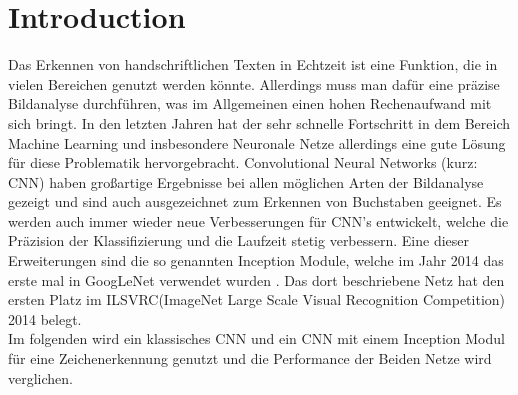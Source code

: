 \documentclass[runningheads,a4paper]{llncs}[2015/06/24]
\begin{document}
\section{Introduction}\label{sec:intro}
Das Erkennen von handschriftlichen Texten in Echtzeit ist eine Funktion, die in vielen Bereichen genutzt werden könnte. Allerdings muss man dafür eine präzise Bildanalyse durchführen, was im Allgemeinen einen hohen Rechenaufwand mit sich bringt. In den letzten Jahren hat der sehr schnelle Fortschritt in dem Bereich Machine Learning und insbesondere Neuronale Netze allerdings eine gute Lösung für diese Problematik hervorgebracht. Convolutional Neural Networks (kurz: CNN) haben großartige Ergebnisse bei allen möglichen Arten der Bildanalyse gezeigt und sind auch ausgezeichnet zum Erkennen von Buchstaben geeignet. Es werden auch immer wieder neue Verbesserungen für CNN's entwickelt, welche die Präzision der Klassifizierung und die Laufzeit stetig verbessern. Eine dieser Erweiterungen sind die so genannten Inception Module, welche im Jahr 2014 das erste mal in GoogLeNet verwendet wurden \cite{inception_paper}. Das dort beschriebene Netz hat den ersten Platz im ILSVRC(ImageNet Large Scale Visual Recognition Competition) 2014 belegt.\\
Im folgenden wird ein klassisches CNN und ein CNN mit einem Inception Modul für eine Zeichenerkennung genutzt und die Performance der Beiden Netze wird verglichen.\\
\end{document}
